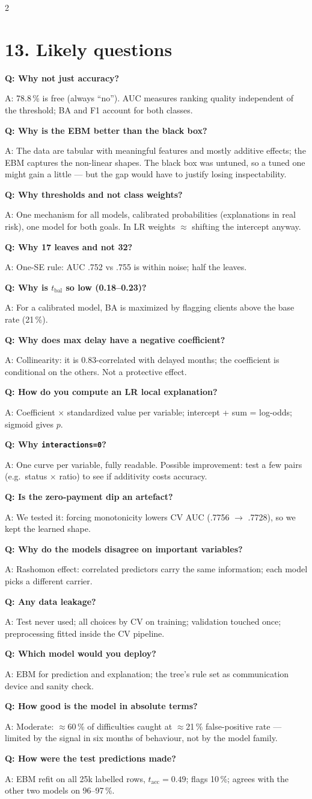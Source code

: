 \documentclass[a4paper,9pt]{extarticle}
\newcommand{\qa}[2]{\par\smallskip\colorbox{qbg}{\parbox{\dimexpr\linewidth-2\fboxsep}{\textbf{Q: #1}}}\par\nopagebreak A: #2\par}
\begin{document}
\begin{multicols}{2}
\section{13. Likely questions}
\qa{Why not just accuracy?}{78.8\,\% is free (always ``no''). AUC measures ranking quality independent of the
threshold; BA and F1 account for both classes.}
\qa{Why is the EBM better than the black box?}{The data are tabular with meaningful features and mostly
additive effects; the EBM captures the non-linear shapes. The black box was untuned, so a tuned one might gain a
little --- but the gap would have to justify losing inspectability.}
\qa{Why thresholds and not class weights?}{One mechanism for all models, calibrated probabilities (explanations
in real risk), one model for both goals. In LR weights $\approx$ shifting the intercept anyway.}
\qa{Why 17 leaves and not 32?}{One-SE rule: AUC .752 vs .755 is within noise; half the leaves.}
\qa{Why is $t_{\text{bal}}$ so low (0.18--0.23)?}{For a calibrated model, BA is maximized by flagging clients
above the base rate (21\,\%).}
\qa{Why does max delay have a negative coefficient?}{Collinearity: it is 0.83-correlated with delayed months;
the coefficient is conditional on the others. Not a protective effect.}
\qa{How do you compute an LR local explanation?}{Coefficient $\times$ standardized value per variable; intercept
+ sum = log-odds; sigmoid gives $p$.}
\qa{Why \texttt{interactions=0}?}{One curve per variable, fully readable. Possible improvement: test a few pairs
(e.g.\ status $\times$ ratio) to see if additivity costs accuracy.}
\qa{Is the zero-payment dip an artefact?}{We tested it: forcing monotonicity lowers CV AUC (.7756 $\to$ .7728),
so we kept the learned shape.}
\qa{Why do the models disagree on important variables?}{Rashomon effect: correlated predictors carry the same
information; each model picks a different carrier.}
\qa{Any data leakage?}{Test never used; all choices by CV on training; validation touched once; preprocessing
fitted inside the CV pipeline.}
\qa{Which model would you deploy?}{EBM for prediction and explanation; the tree's rule set as communication
device and sanity check.}
\qa{How good is the model in absolute terms?}{Moderate: $\approx$60\,\% of difficulties caught at
$\approx$21\,\% false-positive rate --- limited by the signal in six months of behaviour, not by the model family.}
\qa{How were the test predictions made?}{EBM refit on all 25k labelled rows, $t_{\text{acc}}=0.49$; flags
10\,\%; agrees with the other two models on 96--97\,\%.}


\end{multicols}
\end{document}
